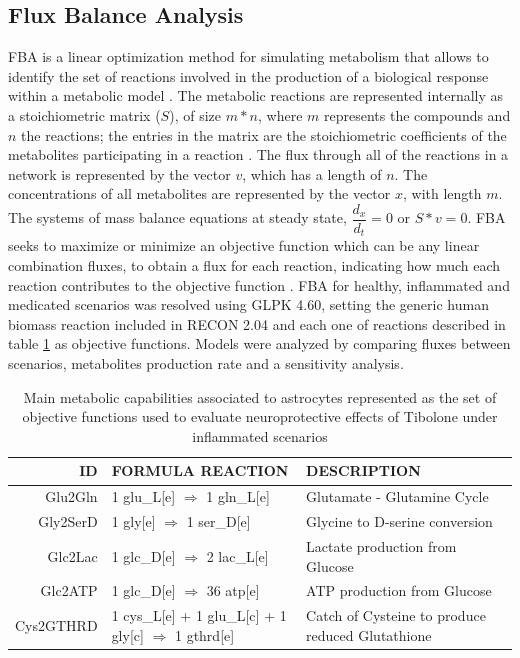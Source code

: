 \subsection*{Flux Balance Analysis}
FBA is a linear optimization method for simulating metabolism that allows to identify the set of reactions involved in the production of a biological response within a metabolic model \cite{Orth2010}. The metabolic reactions are represented internally as a stoichiometric matrix ($S$), of size $m * n$, where $m$ represents the compounds and $n$ the reactions; the entries in the matrix are the stoichiometric coefficients of the metabolites participating in a reaction \cite{Raman2009}. The flux through all of the reactions in a network is represented by the vector $v$, which has a length of $n$. The concentrations of all metabolites are represented by the vector $x$, with length $m$. The systems of mass balance equations at steady state, $\dfrac{d_{x}}{d_{t}}=0$ or $S * v = 0$. FBA seeks to maximize or minimize an objective function which can be any linear combination fluxes, to obtain a flux for each reaction, indicating how much each reaction contributes to the objective function \cite{Orth2010}. FBA for healthy, inflammated and medicated scenarios was resolved using GLPK 4.60, setting the generic human biomass reaction included in RECON 2.04 and each one of reactions described in table \ref{OF} as objective functions. Models were analyzed by comparing fluxes between scenarios, metabolites production rate and a sensitivity analysis.

\begin{table}[h]
\caption{Main metabolic capabilities associated to astrocytes represented as the set of objective functions used to evaluate neuroprotective effects of Tibolone under inflammated scenarios}
\label{OF}
\begin{center}
\begin{tabular}{rm{6.5cm}m{6cm}}
\hline
ID & FORMULA REACTION & DESCRIPTION \\
\hline
\hline
Glu2Gln & 1 glu\_L[e] $\Rightarrow$ 1 gln\_L[e] & Glutamate - Glutamine Cycle \\
Gly2SerD & 1 gly[e] $\Rightarrow$ 1 ser\_D[e] & Glycine to D-serine conversion\\
Glc2Lac & 1 glc\_D[e] $\Rightarrow$ 2 lac\_L[e]& Lactate production from Glucose \\
Glc2ATP & 1 glc\_D[e] $\Rightarrow$ 36 atp[e] & ATP production from Glucose \\
Cys2GTHRD&1 cys\_L[e] + 1 glu\_L[c] + 1 gly[c] $\Rightarrow$ 1 gthrd[e]& Catch of Cysteine to produce reduced Glutathione \\
\hline
\end{tabular}
\end{center}
\end{table} 
